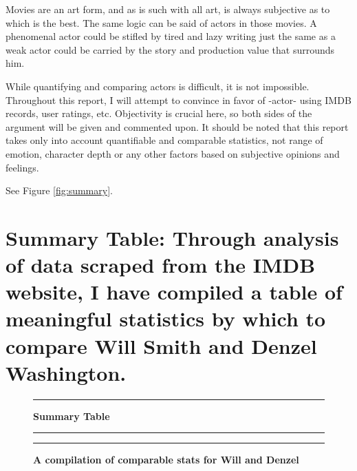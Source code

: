 \documentclass[]{article}
\begin{document}
Movies are an art form, and as is such with all art, is always
subjective as to which is the best. The same logic can be said of actors
in those movies. A phenomenal actor could be stifled by tired and lazy
writing just the same as a weak actor could be carried by the story and
production value that surrounds him.

While quantifying and comparing actors is difficult, it is not
impossible. Throughout this report, I will attempt to convince in favor
of -actor- using IMDB records, user ratings, etc. Objectivity is crucial
here, so both sides of the argument will be given and commented upon. It
should be noted that this report takes only into account quantifiable
and comparable statistics, not range of emotion, character depth or any
other factors based on subjective opinions and feelings.

\newpage

See Figure \ref{fig:summary}.

\section{Summary Table:  Through analysis of data scraped from the IMDB website, I have compiled a table of meaningful statistics by which to compare Will Smith and Denzel Washington. }
\label{sec:rq}

\begin{figure}[!ht]
    \hrule
    \caption{ \textbf{Summary Table} }
    \begin{center}
    \end{center}
    \label{fig:summary}
  \hrule
  \vspace{2.5mm}
      \caption{\textbf{ A compilation of comparable stats for Will and Denzel }   }
      \label{fig:compilation}
  \vspace{-2.5mm}
  \hrule
\end{figure}
\newpage
\end{document}

